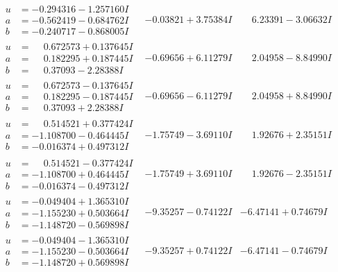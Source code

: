 \documentclass[1p]{elsarticle_modified}
\theoremstyle{definition}
\begin{document}
$$\begin{array}{c|c|c}
\begin{aligned}
u &= -0.294316 - 1.257160 I \\
a &= -0.562419 - 0.684762 I \\
b &= -0.240717 - 0.868005 I\end{aligned}
 & -0.03821 + 3.75384 I & \phantom{-}6.23391 - 3.06632 I \\ \hline\begin{aligned}
u &= \phantom{-}0.672573 + 0.137645 I \\
a &= \phantom{-}0.182295 + 0.187445 I \\
b &= \phantom{-}0.37093 - 2.28388 I\end{aligned}
 & -0.69656 + 6.11279 I & \phantom{-}2.04958 - 8.84990 I \\ \hline\begin{aligned}
u &= \phantom{-}0.672573 - 0.137645 I \\
a &= \phantom{-}0.182295 - 0.187445 I \\
b &= \phantom{-}0.37093 + 2.28388 I\end{aligned}
 & -0.69656 - 6.11279 I & \phantom{-}2.04958 + 8.84990 I \\ \hline\begin{aligned}
u &= \phantom{-}0.514521 + 0.377424 I \\
a &= -1.108700 - 0.464445 I \\
b &= -0.016374 + 0.497312 I\end{aligned}
 & -1.75749 - 3.69110 I & \phantom{-}1.92676 + 2.35151 I \\ \hline\begin{aligned}
u &= \phantom{-}0.514521 - 0.377424 I \\
a &= -1.108700 + 0.464445 I \\
b &= -0.016374 - 0.497312 I\end{aligned}
 & -1.75749 + 3.69110 I & \phantom{-}1.92676 - 2.35151 I \\ \hline\begin{aligned}
u &= -0.049404 + 1.365310 I \\
a &= -1.155230 + 0.503664 I \\
b &= -1.148720 - 0.569898 I\end{aligned}
 & -9.35257 - 0.74122 I & -6.47141 + 0.74679 I \\ \hline\begin{aligned}
u &= -0.049404 - 1.365310 I \\
a &= -1.155230 - 0.503664 I \\
b &= -1.148720 + 0.569898 I\end{aligned}
 & -9.35257 + 0.74122 I & -6.47141 - 0.74679 I \\ \hline\begin{aligned}

\end{aligned}
\end{array}$$
\end{document}
